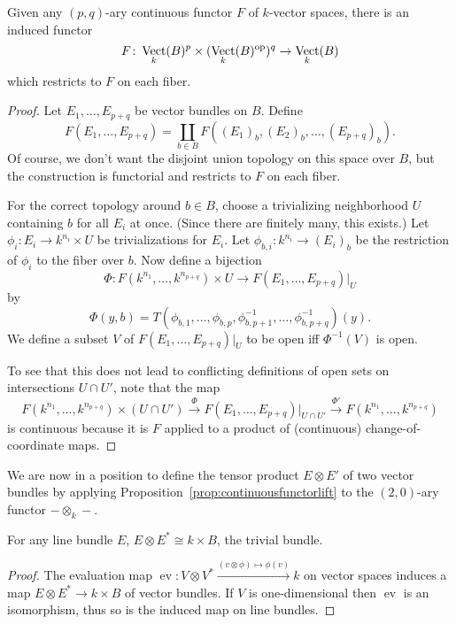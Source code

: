 \documentclass[a4paper,openany]{scrbook}
\DeclareMathOperator{\Vect}{Vect}
\begin{document}
\begin{prop}\label{prop:continuousfunctorlift}
Given any $(p,q)$-ary continuous functor $F$ of $k$-vector spaces, there is an induced functor
\[
F\colon \Vect_k(B)^p \times (\Vect_k(B)^\op)^q \to \Vect_k(B)
\]
which restricts to $F$ on each fiber.
\end{prop}
\begin{proof}
Let $E_1,\dots,E_{p+q}$ be vector bundles on $B$. Define
\[
F(E_1,\dots,E_{p+q}) = \coprod_{b \in B} F((E_1)_b,(E_2)_b,\dots,(E_{p+q})_b).
\]
Of course, we don't want the disjoint union topology on this space over $B$, but the construction is functorial and restricts to $F$ on each fiber.

For the correct topology around $b \in B$, choose a trivializing neighborhood $U$ containing $b$ for all $E_i$ at once. (Since there are finitely many, this exists.) Let $\phi_i\colon E_i \to k^{n_i} \times U$ be trivializations for $E_i$. Let $\phi_{b,i}\colon k^{n_i} \to (E_i)_b$ be the restriction of $\phi_i$ to the fiber over $b$. Now define a bijection
\[
\Phi\colon F(k^{n_1},\dots,k^{n_{p+q}}) \times U \to F(E_1,\dots,E_{p+q})|_U
\]
by
\[
\Phi(y,b) = T(\phi_{b,1},\dots,\phi_{b,p},\phi_{b,p+1}^{-1},\dots,\phi_{b,p+q}^{-1})(y).
\]
We define a subset $V$ of $F(E_1,\dots,E_{p+q})|_U$ to be open iff $\Phi^{-1}(V)$ is open.

To see that this does not lead to conflicting definitions of open sets on intersections $U \cap U'$, note that the map
\[
F(k^{n_1},\dots,k^{n_{p+q}}) \times (U \cap U') \xrightarrow{\Phi} F(E_1,\dots,E_{p+q})|_{U\cap U'} \xrightarrow{\Phi'} F(k^{n_1},\dots,k^{n_{p+q}})
\]
is continuous because it is $F$ applied to a product of (continuous) change-of-coordinate maps.
\end{proof}

We are now in a position to define the tensor product $E \otimes E'$ of two vector bundles by applying Proposition~\ref{prop:continuousfunctorlift} to the $(2,0)$-ary functor $- \otimes_k -$.

\begin{lemma}
For any line bundle $E$, $E \otimes E^* \cong k \times B$, the trivial bundle.
\end{lemma}
\begin{proof}
The evaluation map $\operatorname{ev}\colon V \otimes V^* \xrightarrow{(v \otimes \phi) \mapsto \phi(v)} k$ on vector spaces induces a map $E \otimes E^* \to k \times B$ of vector bundles. If $V$ is one-dimensional then $\operatorname{ev}$ is an isomorphism, thus so is the induced map on line bundles.
\end{proof}
\end{document}
